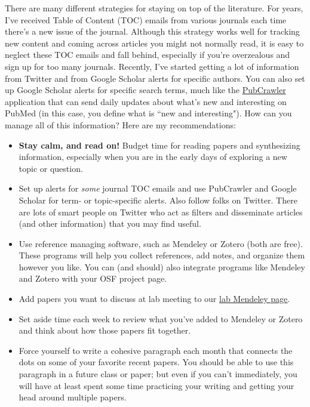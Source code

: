 \documentclass[letterpaper,12pt,oneside]{memoir}
\begin{document}
There are many different strategies for staying on top of the literature. For years, I've received Table of Content (TOC) emails from various journals each time there's a new issue of the journal. Although this strategy works well for tracking new content and coming across articles you might not normally read, it is easy to neglect these TOC emails and fall behind, especially if you're overzealous and sign up for too many journals. Recently, I've started getting a lot of information from Twitter and from Google Scholar alerts for specific authors. You can also set up Google Scholar alerts for specific search terms, much like the \href{http://pubcrawler.gen.tcd.ie/}{PubCrawler} application that can send daily updates about what's new and interesting on PubMed (in this case, you define what is ``new and interesting"). How can you manage all of this information? Here are my recommendations:

\begin{itemize}
\item \textbf{Stay calm, and read on!} Budget time for reading papers and synthesizing information, especially when you are in the early days of exploring a new topic or question. 
\item Set up alerts for \textit{some} journal TOC emails and use PubCrawler and Google Scholar for term- or topic-specific alerts. Also follow folks on Twitter. There are lots of smart people on Twitter who act as filters and disseminate articles (and other information) that you may find useful.
\item Use reference managing software, such as Mendeley or Zotero (both are free). These programs will help you collect references, add notes, and organize them however you like. You can (and should) also integrate programs like Mendeley and Zotero with your OSF project page.
\item Add papers you want to discuss at lab meeting to our \href{https://www.mendeley.com/community/smith-lab-meetings/}{lab Mendeley page}. 
\item Set aside time each week to review what you've added to Mendeley or Zotero and think about how those papers fit together.
\item Force yourself to write a cohesive paragraph each month that connects the dots on some of your favorite recent papers. You should be able to use this paragraph in a future class or paper; but even if you can't immediately, you will have at least spent some time practicing your writing and getting your head around multiple papers.
\end{itemize}
\end{document}
